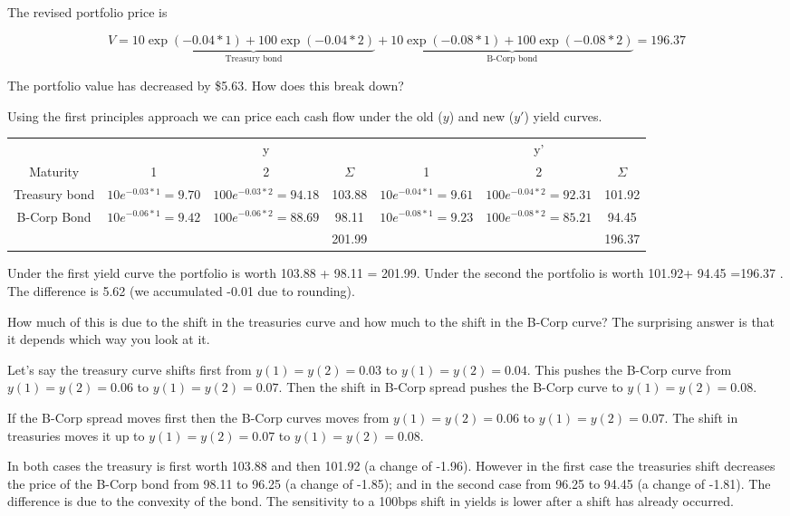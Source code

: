 The revised portfolio price is 

\[ V = \underbrace{10 \exp(-0.04*1)+ 100 \exp(-0.04*2)}_{\textrm{Treasury bond}} + \underbrace{10\exp(-0.08*1)+ 100 \exp(-0.08*2)}_{\textrm{B-Corp bond}} = 196.37\]

The portfolio value has decreased by \$5.63. How does this break down?

Using the first principles approach we can price each cash flow under the old ($y$) and new ($y'$) yield curves. 

\begin{tiny}
\begin{tabular}{|c|cc|c|cc|c|}
\hline
 & & y&  & & y' & \\
 Maturity & 1 & 2 & $\Sigma$ & 1 & 2 & $\Sigma$ \\
 \hline
Treasury bond & $10e^{-0.03*1} = 9.70$  & $100e^{-0.03*2}=94.18$ & 103.88 & $10e^{-0.04*1} = 9.61$ & $100e^{-0.04*2}=92.31$ & 101.92\\
B-Corp Bond & $10e^{-0.06*1} = 9.42$ & $100e^{-0.06*2}= 88.69$ & 98.11 & $10e^{-0.08*1}=9.23$ & $100e^{-0.08*2}=85.21$ & 94.45\\
\hline
 & & & 201.99 & & & 196.37\\
 \hline
\end{tabular}
\end{tiny}

Under the first yield curve the portfolio is worth  103.88 + 98.11 = 201.99.  Under the second the portfolio is worth 101.92+ 94.45 =196.37 . The difference is 5.62 (we accumulated -0.01 due to rounding). 

How much of this is due to the shift in the treasuries curve and how much to the shift in the B-Corp curve? The surprising answer is that it depends which way you look at it. 

Let's say the treasury curve shifts first from $y(1) = y(2) = 0.03$ to $y(1) = y(2) = 0.04$. This pushes the B-Corp curve from $y(1) = y(2) = 0.06$ to $y(1) = y(2) = 0.07$. Then the shift in B-Corp spread pushes the B-Corp curve to $y(1) = y(2) = 0.08$.

If the B-Corp spread moves first then the B-Corp curves moves from $y(1) = y(2) = 0.06$ to $y(1) = y(2) = 0.07$. The shift in treasuries moves it up to $y(1) = y(2) = 0.07$ to $y(1) = y(2) = 0.08$.

In both cases the treasury is first worth 103.88 and then 101.92 (a change of -1.96).  However in the first case the treasuries shift decreases the price of the B-Corp bond from 98.11 to 96.25 (a change of -1.85); and in the second case from 96.25 to 94.45 (a change of -1.81). The difference is due to the convexity of the bond. The sensitivity to a 100bps shift in yields is lower after a shift has already occurred.


